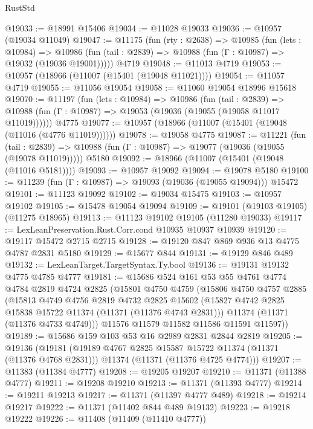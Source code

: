 \begin{lexlean}{RustStd}
\begin{coremodule}
@19033 := @18991 @15406
@19034 := @11028 @19033
@19036 := @10957 (@19034 @11049)
@19047 := @11175
    (fun (rty : @2638) =>
    @10985
      (fun (lets : @10984) =>
      @10986 (fun (tail : @2839) => @10988 (fun (Γ : @10987) => @19032 (@19036 @19001)))))
    @4719
@19048 := @11013 @4719
@19053 := @10957 (@18966 (@11007 (@15401 (@19048 @11021))))
@19054 := @11057 @4719
@19055 := @11056 @19054
@19058 := @11060 @19054 @18996 @15618
@19070 := @11197
    (fun (lets : @10984) =>
    @10986
      (fun (tail : @2839) =>
      @10988 (fun (Γ : @10987) => @19053 (@19036 (@19055 (@19058 @11017 @11019))))))
    @4775
@19077 := @10957 (@18966 (@11007 (@15401 (@19048 (@11016 (@4776 @11019))))))
@19078 := @19058 @4775
@19087 := @11221
    (fun (tail : @2839) => @10988 (fun (Γ : @10987) => @19077 (@19036 (@19055 (@19078 @11019)))))
    @5180
@19092 := @18966 (@11007 (@15401 (@19048 (@11016 @5181))))
@19093 := @10957 @19092
@19094 := @19078 @5180
@19100 := @11239 (fun (Γ : @10987) => @19093 (@19036 (@19055 @19094))) @15472
@19101 := @11123 @19092
@19102 := @19034 @15475
@19103 := @10957 @19102
@19105 := @15478 @19054 @19094
@19109 := @19101 (@19103 @19105) (@11275 @18965)
@19113 := @11123 @19102 @19105 (@11280 @19033)
@19117 := LexLeanPreservation.Rust.Corr.cond @10935 @10937 @10939
@19120 := @19117 @15472 @2715 @2715
@19128 := @19120 @847 @869 @936 @13 @4775 @4787 @2831 @5180
@19129 := @15677 @844
@19131 := @19129 @846 @489
@19132 := LexLeanTarget.TargetSyntax.Ty.bool
@19136 := @19131 @19132 @4775 @4785 @4777
@19181 := @15686
    @524
    @161
    @53
    @55
    @4761
    @4774
    @4784
    @2819
    @4724
    @2825
    (@15801
      @4750
      @4759
      (@15806
        @4750
        @4757
        @2885
        (@15813
          @4749
          @4756
          @2819
          @4732
          @2825
          @15602
          (@15827 @4742 @2825 @15838 @15722 @11374 (@11371 (@11376 @4743 @2831)))
          @11374
          (@11371 (@11376 @4733 @4749)))
        @11576
        @11579
        @11582
        @11586
        @11591
        @11597))
@19189 := @15686 @159 @103 @53 @16 @2989 @2831 @2844 @2819
@19205 := @19136
    (@19181
      (@19189 @4767 @2825 @15587 @15722 @11374 (@11371 (@11376 @4768 @2831)))
      @11374
      (@11371 (@11376 @4725 @4774)))
@19207 := @11383 (@11384 @4777)
@19208 := @19205 @19207
@19210 := @11371 (@11388 @4777)
@19211 := @19208 @19210
@19213 := @11371 (@11393 @4777)
@19214 := @19211 @19213
@19217 := @11371 (@11397 @4777 @489)
@19218 := @19214 @19217
@19222 := @11371 (@11402 @844 @489 @19132)
@19223 := @19218 @19222
@19226 := @11408 (@11409 (@11410 @4777))

\end{coremodule}
\end{lexlean}
